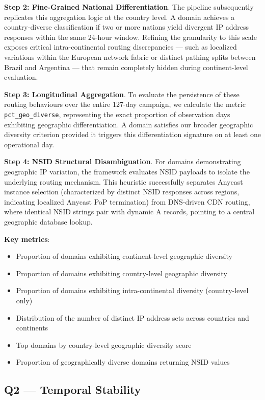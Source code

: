 \textbf{Step 2: Fine-Grained National Differentiation}. The pipeline subsequently replicates this aggregation logic at the country level. A domain achieves a country-diverse classification if two or more nations yield divergent \ac{IP} address responses within the same 24-hour window. Refining the granularity to this scale exposes critical intra-continental routing discrepancies — such as localized variations within the European network fabric or distinct pathing splits between Brazil and Argentina — that remain completely hidden during continent-level evaluation.

\textbf{Step 3: Longitudinal Aggregation}. To evaluate the persistence of these routing behaviours over the entire 127-day campaign, we calculate the metric \texttt{pct\_geo\_diverse}, representing the exact proportion of observation days exhibiting geographic differentiation. A domain satisfies our broader geographic diversity criterion provided it triggers this differentiation signature on at least one operational day.

\textbf{Step 4: \ac{NSID} Structural Disambiguation}. For domains demonstrating geographic \ac{IP} variation, the framework evaluates \ac{NSID} payloads to isolate the underlying routing mechanism. This heuristic successfully separates Anycast instance selection (characterized by distinct \ac{NSID} responses across regions, indicating localized Anycast \ac{PoP} termination) from \ac{DNS}-driven \ac{CDN} routing, where identical \ac{NSID} strings pair with dynamic \ac{A} records, pointing to a central geographic database lookup.

\textbf{Key metrics}:
\begin{itemize}
  \item Proportion of domains exhibiting continent-level geographic diversity
  \item Proportion of domains exhibiting country-level geographic diversity
  \item Proportion of domains exhibiting intra-continental diversity (country-level only)
  \item Distribution of the number of distinct \ac{IP} address sets across countries and continents
  \item Top domains by country-level geographic diversity score
  \item Proportion of geographically diverse domains returning \ac{NSID} values
\end{itemize}

\subsection{Q2 --- Temporal Stability}
\label{subsec:3.5.3}

